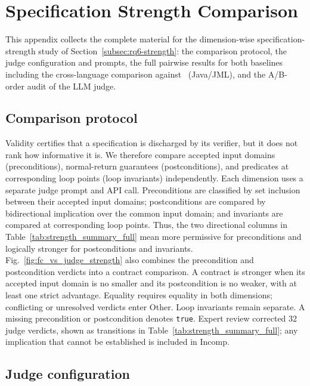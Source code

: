 \section{{Specification Strength Comparison}}
\label{app:strength}

{This appendix collects the complete material for the dimension-wise specification-strength study of Section~\ref{subsec:rq6-strength}: the comparison protocol, the judge configuration and prompts, the full pairwise results for both baselines including the cross-language comparison against \specgen\ (Java/JML), and the A/B-order audit of the LLM judge.}

\subsection{{Comparison protocol}}
\label{app:strength-protocol}

{Validity certifies that a specification is discharged by its verifier, but it does not rank how informative it is. We therefore compare accepted input domains (preconditions), normal-return guarantees (postconditions), and predicates at corresponding loop points (loop invariants) independently. Each dimension uses a separate judge prompt and API call. Preconditions are classified by set inclusion between their accepted input domains; postconditions are compared by bidirectional implication over the common input domain; and invariants are compared at corresponding loop points. Thus, the two directional columns in Table~\ref{tab:strength_summary_full} mean more permissive for preconditions and logically stronger for postconditions and invariants. Fig.~\ref{fig:fc_vs_judge_strength} also combines the precondition and postcondition verdicts into a contract comparison. A contract is stronger when its accepted input domain is no smaller and its postcondition is no weaker, with at least one strict advantage. Equality requires equality in both dimensions; conflicting or unresolved verdicts enter Other. Loop invariants remain separate. A missing precondition or postcondition denotes \texttt{true}. Expert review corrected 32 judge verdicts, shown as transitions in Table~\ref{tab:strength_summary_full}; any implication that cannot be established is included in Incomp.}

\subsection{{Judge configuration}}
\label{app:judge-config}


